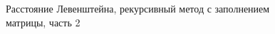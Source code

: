 \documentclass[12pt,a4paper]{report}
\begin{document}
\begin{figure}[h]
\caption{Расстояние Левенштейна, рекурсивный метод с заполнением матрицы, часть 2}
\label{fig:image}
\end{figure}
\end{document}
